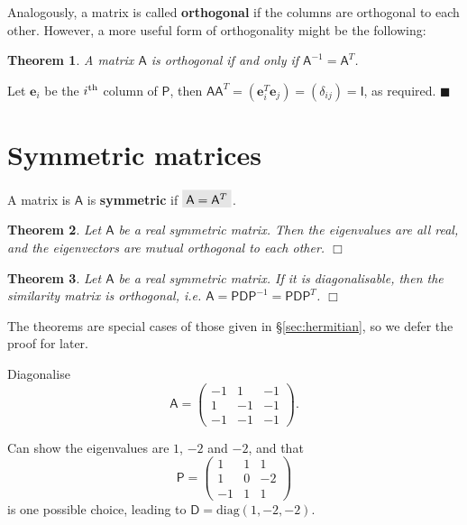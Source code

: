\documentclass[letter-paper]{tufte-book}
\newtheorem{theorem}{\color{pastel-blue}Theorem}[section]
\newenvironment{proof}[1][Proof]{\begin{trivlist}
\item[\hskip \labelsep {\bfseries #1}]}{\end{trivlist}}
\newenvironment{example}[1][Example]{\begin{trivlist}
\item[\hskip \labelsep {\bfseries #1}]}{\end{trivlist}}
\newcommand{\As}{{\mathsf{A}}}
\newcommand{\Ds}{{\mathsf{D}}}
\newcommand{\Is}{{\mathsf{I}}}
\newcommand{\Ps}{{\mathsf{P}}}
\newcommand{\eb}{{\boldsymbol{e}}}
\newcommand{\qed}{\hfill$\blacksquare$}
\newcommand{\qedwhite}{\hfill \ensuremath{\Box}}
\newcommand{\highlight}[1]{\mathchoice%
  {\colorbox{black!10}{$\displaystyle#1$}}%
  {\colorbox{black!10}{$\textstyle#1$}}%
  {\colorbox{black!10}{$\scriptstyle#1$}}%
  {\colorbox{black!10}{$\scriptscriptstyle#1$}}}%
\begin{document}
Analogously, a matrix is called \textbf{orthogonal} if the columns are
orthogonal to each other. However, a more useful form of orthogonality might be
the following:
\begin{theorem}
  A matrix $\As$ is orthogonal if and only if $\As^{-1} = \As^T$.
\end{theorem}

\begin{proof}
  Let $\eb_i$ be the $i^{\textnormal{th}}$ column of $\Ps$, then $\As \As^T =
  (\eb_i^T \eb_j) = (\delta_{ij}) = \Is$, as required. \qed
\end{proof}


\section{Symmetric matrices}

A matrix is $\As$ is \textbf{symmetric} if $\highlight{\As = \As^T}$.

\begin{theorem}\label{thm:real_sym_eigen}
  Let $\As$ be a real symmetric matrix. Then the eigenvalues are all real, and
  the eigenvectors are mutual orthogonal to each other. \qedwhite
\end{theorem}

\begin{theorem}
  Let $\As$ be a real symmetric matrix. If it is diagonalisable, then the
  similarity matrix is orthogonal, i.e. $\As = \Ps \Ds \Ps^{-1} = \Ps \Ds
  \Ps^T$. \qedwhite
\end{theorem}

The theorems are special cases of those given in \S\ref{sec:hermitian}, so we
defer the proof for later.

\begin{example}
  Diagonalise
  \begin{equation*}
    \As = \begin{pmatrix}-1 & 1 & -1 \\ 1 & -1 & -1 \\ -1 & -1 & -1\end{pmatrix}.
  \end{equation*}
  
  Can show the eigenvalues are $1$, $-2$ and $-2$, and that
  \begin{equation*}
    \Ps = \begin{pmatrix}1 & 1 & 1 \\ 1 & 0 & -2 \\ -1 & 1 & 1\end{pmatrix}
  \end{equation*}
  is one possible choice, leading to $\Ds = \mbox{diag}(1, -2, -2)$.
\end{example}
\end{document}
